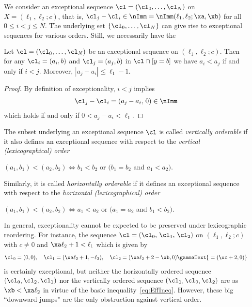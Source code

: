 We consider an exceptional sequence 
$\cl=(\cl_0,\ldots,\cl_N)$ on 
$X=(\ell_1,\ell_2;c)$, that is, 
$\cl_j-\cl_i\in\nImm=
\nImm(\ell_1,\ell_2;\xa,\xb)$ 
for all $0\leq i<j\leq N$. The 
underlying set $\{\cl_0,\ldots,\cl_N\}$ 
can give rise to exceptional 
sequences for various orders.
Still, we necessarily have the

\begin{lemma}
\label{lem:HorOrd}
Let $\cl=(\cl_0,\ldots,\cl_N)$ 
be an exceptional sequence on 
$(\ell_1,\ell_2;c)$. Then for 
any $\cl_i=(a_i,b)$ and $\cl_j=(a_j,b)$ 
in $\cl\cap[y=b]$ we have $a_i<a_j$ 
if and only if $i<j$. Moreover, 
$|a_j-a_i|\leq\ell_1-1$.
\end{lemma}

\begin{proof}
By definition of exceptionality, 
$i<j$ implies
$$
\cl_j-\cl_i=(a_j-a_i,\,0)\in\nImm
$$
which holds if and only if 
$0<a_j-a_i<\ell_1$. 
\end{proof}

\begin{defi}
The subset  
underlying an exceptional sequence 
$\cl$ is called {\em vertically orderable} 
if it also defines an exceptional 
sequence with respect to the {\em vertical 
(lexicographical) order} 
\begin{center}
$(a_1,b_1)<(a_2,b_2) \Leftrightarrow b_1<b_2$ or $\big(b_1=b_2$ and $a_1<a_2\big)$.
\end{center}
Similarly, it is called {\em horizontally 
orderable} if it defines an exceptional 
sequence with respect to the 
{\em horizontal (lexicographical) order}
\begin{center}
$(a_1,b_1)<(a_2,b_2) \Leftrightarrow a_1<a_2$ or $\big(a_1=a_2$ and 
$b_1<b_2\big)$.
\end{center}
\end{defi}

In general, exceptionality cannot 
be expected to be preserved under 
lexicographic reordering. For 
instance, the sequence 
$\cl=(\cl_0,\,\cl_1,\,\cl_2)$ on 
$(\ell_1,\ell_2;c)$ with $c\not=0$ 
and $\xa\ell_2+1<\ell_1$ 
which is given by
$$
\cl_0=(0,0),\quad\cl_1=(\xa\ell_2+1,
-\ell_2),
\quad\cl_2= (\xa\ell_2+2-\xb,0)
\gammaText{\;=(\xc+2,0)}
$$ 
is certainly exceptional, but 
neither the horizontally ordered 
sequence $(\cl_0,\cl_2,\cl_1)$ nor 
the vertically ordered sequence 
$(\cl_1,\cl_0,\cl_2)$ are as
$\xb<\xa\ell_2$ in virtue of the
basic inequality~\eqref{eq:EffIneq}. 
However, these big ``downward jumps'' are 
the only obstruction against vertical 
order. 

